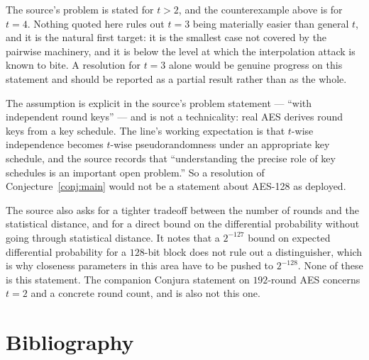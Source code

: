 \documentclass{conjura-conjecture}
\begin{document}
\begin{remark}[Where $t = 3$ sits]\label{rem:three}
The source's problem is stated for $t > 2$, and the counterexample above
is for $t = 4$. Nothing quoted here rules out $t = 3$ being materially
easier than general $t$, and it is the natural first target: it is the
smallest case not covered by the pairwise machinery, and it is below the
level at which the interpolation attack is known to bite. A resolution
for $t = 3$ alone would be genuine progress on this statement and should
be reported as a partial result rather than as the whole.
\end{remark}

\begin{remark}\label{rem:keys}
The assumption is explicit in the source's problem statement --- ``with
independent round keys'' --- and is not a technicality: real AES derives
round keys from a key schedule. The line's working expectation is that
$t$-wise independence becomes $t$-wise pseudorandomness under an
appropriate key schedule, and the source records that ``understanding the
precise role of key schedules is an important open problem.'' So a
resolution of Conjecture~\ref{conj:main} would not be a statement about
AES-128 as deployed.
\end{remark}

\begin{remark}\label{rem:neighbours}
The source also asks for a tighter tradeoff between the number of rounds
and the statistical distance, and for a direct bound on the differential
probability without going through statistical distance. It notes that a
$2^{-127}$ bound on expected differential probability for a $128$-bit
block does not rule out a distinguisher, which is why closeness
parameters in this area have to be pushed to $2^{-128}$. None of these is
this statement. The companion Conjura statement on $192$-round AES
concerns $t = 2$ and a concrete round count, and is also not this one.
\end{remark}

\section{Bibliography}
\end{document}
